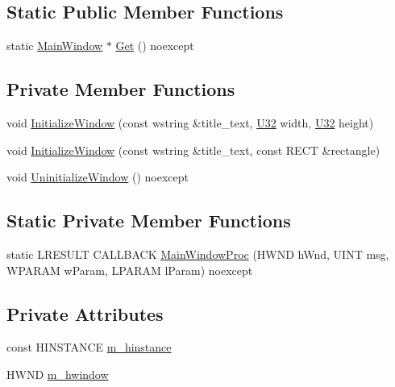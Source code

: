 \subsection*{Static Public Member Functions}
\begin{DoxyCompactItemize}
\item 
static \hyperlink{classmage_1_1_main_window}{Main\+Window} $\ast$ \hyperlink{classmage_1_1_main_window_ab670605775c88e0121afa7a52ac88ddf}{Get} () noexcept
\end{DoxyCompactItemize}
\subsection*{Private Member Functions}
\begin{DoxyCompactItemize}
\item 
void \hyperlink{classmage_1_1_main_window_a5487a4a894e1fff7145f2d363a96ca0e}{Initialize\+Window} (const wstring \&title\+\_\+text, \hyperlink{namespacemage_a41c104c036fba3756a74e19f793eeaa1}{U32} width, \hyperlink{namespacemage_a41c104c036fba3756a74e19f793eeaa1}{U32} height)
\item 
void \hyperlink{classmage_1_1_main_window_ab87716ce916ba180068a65294fa037e8}{Initialize\+Window} (const wstring \&title\+\_\+text, const R\+E\+CT \&rectangle)
\item 
void \hyperlink{classmage_1_1_main_window_a229ff4bcc198ed9caf2ce54966caf746}{Uninitialize\+Window} () noexcept
\end{DoxyCompactItemize}
\subsection*{Static Private Member Functions}
\begin{DoxyCompactItemize}
\item 
static L\+R\+E\+S\+U\+LT C\+A\+L\+L\+B\+A\+CK \hyperlink{classmage_1_1_main_window_a66858afa3233e7c7fbf770fa01985b78}{Main\+Window\+Proc} (H\+W\+ND h\+Wnd, U\+I\+NT msg, W\+P\+A\+R\+AM w\+Param, L\+P\+A\+R\+AM l\+Param) noexcept
\end{DoxyCompactItemize}
\subsection*{Private Attributes}
\begin{DoxyCompactItemize}
\item 
const H\+I\+N\+S\+T\+A\+N\+CE \hyperlink{classmage_1_1_main_window_a314759bf324579b568528bbf99bc5c7f}{m\+\_\+hinstance}
\item 
H\+W\+ND \hyperlink{classmage_1_1_main_window_afc9afabcf8a52d79f02c8352451863cc}{m\+\_\+hwindow}
\end{DoxyCompactItemize}



